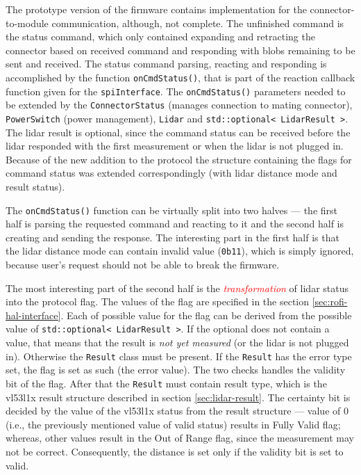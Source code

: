 \documentclass[
  digital,     %
  oneside,     %
  nosansbold,  %
  nocolorbold, %
  lof,         %
  lot,         %
]{fithesis4}
\newcommand{\TODO}[1]{\textcolor{red}{\textit{#1}}}
\begin{document}
{{{The prototype version of the firmware contains implementation for the connector-to-module communication, although, not complete. The unfinished command is the status command, which only contained expanding and retracting the connector based on received command and responding with blobs remaining to be sent and received. The status command parsing, reacting and responding is accomplished by the function \lstinline|onCmdStatus()|, that is part of the reaction callback function given for the \lstinline|spiInterface|. The \lstinline|onCmdStatus()| parameters needed to be extended by the \lstinline|ConnectorStatus| (manages connection to mating connector), \lstinline|PowerSwitch| (power management), \lstinline|Lidar| and \lstinline|std::optional< LidarResult >|. The \acrshort{lidar} result is optional, since the command status can be received before the \acrshort{lidar} responded with the first measurement or when the \acrshort{lidar} is not plugged in. Because of the new addition to the protocol the structure containing the flags for command status was extended correspondingly (with \acrshort{lidar} distance mode and result status).

The \lstinline|onCmdStatus()| function can be virtually split into two halves --- the first half is parsing the requested command and reacting to it and the second half is creating and sending the response. The interesting part in the first half is that the \acrshort{lidar} distance mode can contain invalid value (\lstinline|0b11|), which is simply ignored, because user's request should not be able to break the firmware.

The most interesting part of the second half is the \TODO{transformation} of \acrshort{lidar} status into the protocol flag. The values of the flag are specified in the section \ref{sec:rofi-hal-interface}. Each of possible value for the flag can be derived from the possible value of \lstinline|std::optional< LidarResult >|. If the optional does not contain a value, that means that the result is \emph{not yet measured} (or the \acrshort{lidar} is not plugged in). Otherwise the \lstinline|Result| class must be present. If the \lstinline|Result| has the error type set, the flag is set as such (the error value). The two checks handles the validity bit of the flag. After that the \lstinline|Result| must contain result type, which is the \gls{vl53l1x} result structure described in section \ref{sec:lidar-result}. The certainty bit is decided by the value of the \gls{vl53l1x} status from the result structure --- value of $0$ (i.e., the previously mentioned value of valid status) results in Fully Valid flag; whereas, other values result in the Out of Range flag, since the measurement may not be correct. Consequently, the distance is set only if the validity bit is set to valid.

}}}
\end{document}
